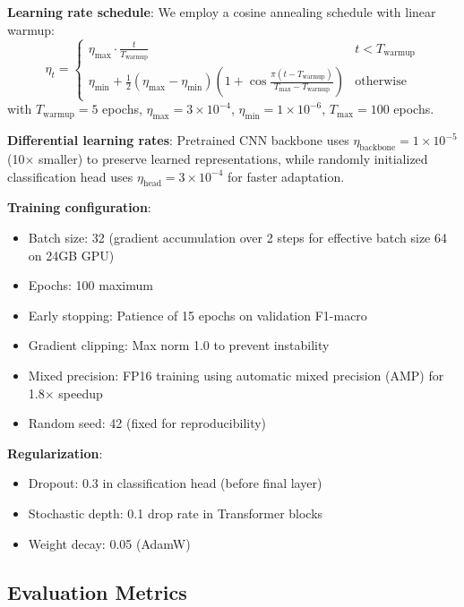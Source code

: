 \textbf{Learning rate schedule}: We employ a cosine annealing schedule with linear warmup:
\begin{equation}
\eta_t = \begin{cases}
\eta_{\text{max}} \cdot \frac{t}{T_{\text{warmup}}} & t < T_{\text{warmup}} \\
\eta_{\text{min}} + \frac{1}{2}(\eta_{\text{max}} - \eta_{\text{min}})\left(1 + \cos\frac{\pi(t - T_{\text{warmup}})}{T_{\text{max}} - T_{\text{warmup}}}\right) & \text{otherwise}
\end{cases}
\end{equation}
with $T_{\text{warmup}} = 5$ epochs, $\eta_{\text{max}} = 3 \times 10^{-4}$, $\eta_{\text{min}} = 1 \times 10^{-6}$, $T_{\text{max}} = 100$ epochs.

\textbf{Differential learning rates}: Pretrained CNN backbone uses $\eta_{\text{backbone}} = 1 \times 10^{-5}$ (10$\times$ smaller) to preserve learned representations, while randomly initialized classification head uses $\eta_{\text{head}} = 3 \times 10^{-4}$ for faster adaptation.

\textbf{Training configuration}:
\begin{itemize}
    \item Batch size: 32 (gradient accumulation over 2 steps for effective batch size 64 on 24GB GPU)
    \item Epochs: 100 maximum
    \item Early stopping: Patience of 15 epochs on validation F1-macro
    \item Gradient clipping: Max norm 1.0 to prevent instability
    \item Mixed precision: FP16 training using automatic mixed precision (AMP) for 1.8$\times$ speedup
    \item Random seed: 42 (fixed for reproducibility)
\end{itemize}

\textbf{Regularization}:
\begin{itemize}
    \item Dropout: 0.3 in classification head (before final layer)
    \item Stochastic depth: 0.1 drop rate in Transformer blocks~\cite{huang2016deep}
    \item Weight decay: 0.05 (AdamW)
\end{itemize}

\subsection{Evaluation Metrics}
\label{subsec:metrics}

